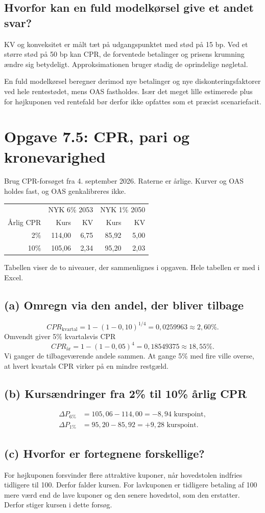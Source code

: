 \documentclass[11pt,a4paper]{article}
\newcommand{\opgave}[1]{\section*{#1}}
\newcommand{\del}[1]{\subsection*{#1}}
\begin{document}
\del{Hvorfor kan en fuld modelkørsel give et andet svar?}
KV og konveksitet er målt tæt på udgangspunktet med stød på 15 bp. Ved et større stød på 50 bp kan CPR, de forventede betalinger og prisens krumning ændre sig betydeligt. Approksimationen bruger stadig de oprindelige nøgletal.

En fuld modelkørsel beregner derimod nye betalinger og nye diskonteringsfaktorer ved hele rentestødet, mens OAS fastholdes. Især det meget lille estimerede plus for højkuponen ved rentefald bør derfor ikke opfattes som et præcist scenariefacit.

\newpage
\opgave{Opgave 7.5: CPR, pari og kronevarighed}
\begin{tcolorbox}[title=Opgavebeskrivelse]
Brug CPR-forsøget fra 4. september 2026. Raterne er årlige. Kurver og OAS holdes fast, og OAS genkalibreres ikke.
\begin{center}\begin{tabular}{rrrrr}\toprule
 & \multicolumn{2}{c}{NYK 6\% 2053} & \multicolumn{2}{c}{NYK 1\% 2050}\\
Årlig CPR & Kurs & KV & Kurs & KV\\\midrule
2\% & 114,00 & 6,75 & 85,92 & 5,00\\
10\% & 105,06 & 2,34 & 95,20 & 2,03\\
\bottomrule
\end{tabular}\end{center}
Tabellen viser de to niveauer, der sammenlignes i opgaven. Hele tabellen er med i Excel.
\end{tcolorbox}
\del{(a) Omregn via den andel, der bliver tilbage}
\[
CPR_{\mathrm{kvartal}}=1-(1-0{,}10)^{1/4}=0{,}0259963\approx\boxed{2{,}60\%}.
\]
Omvendt giver 5\% kvartalsvis CPR
\[
CPR_{\text{år}}=1-(1-0{,}05)^4=0{,}18549375\approx\boxed{18{,}55\%}.
\]
Vi ganger de tilbageværende andele sammen. At gange 5\% med fire ville overse, at hvert kvartals CPR virker på en mindre restgæld.

\del{(b) Kursændringer fra 2\% til 10\% årlig CPR}
\[
\begin{aligned}
\Delta P_{6\%}&=105{,}06-114{,}00=\boxed{-8{,}94\text{ kurspoint}},\\
\Delta P_{1\%}&=95{,}20-85{,}92=\boxed{+9{,}28\text{ kurspoint}}.
\end{aligned}
\]
\del{(c) Hvorfor er fortegnene forskellige?}
For højkuponen forsvinder flere attraktive kuponer, når hovedstolen indfries tidligere til 100. Derfor falder kursen. For lavkuponen er tidligere betaling af 100 mere værd end de lave kuponer og den senere hovedstol, som den erstatter. Derfor stiger kursen i dette forsøg.
\end{document}
